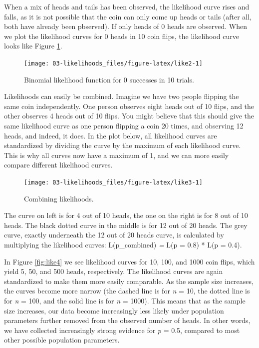 \documentclass[
  oneside]{book}
\begin{document}
When a mix of heads and tails has been observed, the likelihood curve rises and falls, as it is not possible that the coin can only come up heads or tails (after all, both have already been pbserved). If only heads of 0 heads are observed. When we plot the likelihood curves for 0 heads in 10 coin flips, the likelihood curve looks like Figure \ref{fig:like2}.



\begin{figure}

{\centering \texttt{[image: 03-likelihoods\_files/figure-latex/like2-1]} 

}

\caption{Binomial likelihood function for 0 successes in 10 trials.}\label{fig:like2}
\end{figure}

Likelihoods can easily be combined. Imagine we have two people flipping the same coin independently. One person observes eight heads out of 10 flips, and the other observes 4 heads out of 10 flips. You might believe that this should give the same likelihood curve as one person flipping a coin 20 times, and observing 12 heads, and indeed, it does. In the plot below, all likelihood curves are standardized by dividing the curve by the maximum of each likelihood curve. This is why all curves now have a maximum of 1, and we can more easily compare different likelihood curves.



\begin{figure}

{\centering \texttt{[image: 03-likelihoods\_files/figure-latex/like3-1]} 

}

\caption{Combining likelihoods.}\label{fig:like3}
\end{figure}

The curve on left is for 4 out of 10 heads, the one on the right is for 8 out of 10 heads. The black dotted curve in the middle is for 12 out of 20 heads. The grey curve, exactly underneath the 12 out of 20 heads curve, is calculated by multiplying the likelihood curves: L(p\_combined) \emph{=} L(p = 0.8) * L(p = 0.4).

In Figure \ref{fig:like4} we see likelihood curves for 10, 100, and 1000 coin flips, which yield 5, 50, and 500 heads, respectively. The likelihood curves are again standardized to make them more easily comparable. As the sample size increases, the curves become more narrow (the dashed line is for \emph{n} = 10, the dotted line is for \emph{n} = 100, and the solid line is for \emph{n} = 1000). This means that as the sample size increases, our data become increasingly less likely under population parameters further removed from the observed number of heads. In other words, we have collected increasingly strong evidence for \emph{p} = 0.5, compared to most other possible population parameters.
\end{document}
